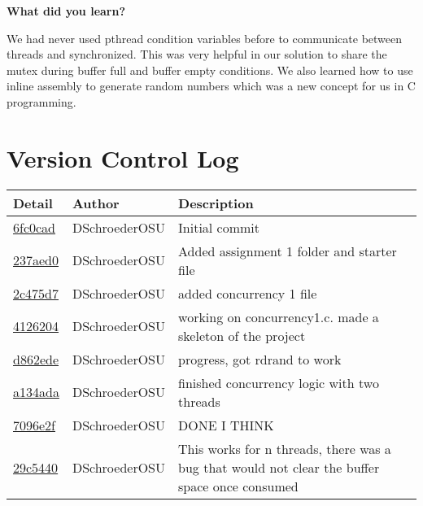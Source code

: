 \documentclass[10pt,letterpaper,draftclsnofoot,onecolumn]{IEEEtran}
\begin{document}
\bigskip

\noindent\textbf{What did you learn?}
\medskip

\noindent We had never used pthread condition variables before to communicate between threads and synchronized. This was very helpful in our solution to share the mutex during buffer full and buffer empty conditions. We also learned how to use inline assembly to generate random numbers which was a new concept for us in C programming.\par
\bigskip

\section{Version Control Log}
\bigskip

\noindent\begin{tabular}{l l l}\textbf{Detail} & \textbf{Author} & \textbf{Description}\\\hline
\href{https://github.com/DSchroederOSU/CS444-Group\_11\_05/commit/6fc0cad45a2a515f54c120fa6d411cbb62a0eed5}{6fc0cad} & DSchroederOSU & Initial commit\\\hline
\href{https://github.com/DSchroederOSU/CS444-Group\_11\_05/commit/237aed09afe1e61e9421f419164f4d41387adddd}{237aed0} & DSchroederOSU & Added assignment 1 folder and starter file\\\hline
\href{https://github.com/DSchroederOSU/CS444-Group\_11\_05/commit/2c475d7e15d1a54406c275a2a27c5df472c46ded}{2c475d7} & DSchroederOSU & added concurrency 1 file\\\hline
\href{https://github.com/DSchroederOSU/CS444-Group\_11\_05/commit/4126204c49cd2e10090eb4d6bd3183bc23c94648}{4126204} & DSchroederOSU & working on concurrency1.c. made a skeleton of the project\\\hline
\href{https://github.com/DSchroederOSU/CS444-Group\_11\_05/commit/d862edec54dd0eb51bdde6e26337315a2675d434}{d862ede} & DSchroederOSU & progress, got rdrand to work\\\hline
\href{https://github.com/DSchroederOSU/CS444-Group\_11\_05/commit/a134adaeeff0b0ebc7bc662d809edc973ab6f841}{a134ada} & DSchroederOSU & finished concurrency logic with two threads\\\hline
\href{https://github.com/DSchroederOSU/CS444-Group\_11\_05/commit/7096e2f214d8f164dcf02c58d8924f903281e867}{7096e2f} & DSchroederOSU & DONE I THINK\\\hline
\href{https://github.com/DSchroederOSU/CS444-Group\_11\_05/commit/29c5440b4d14c3656d11c907e8794f6f08d98897}{29c5440} & DSchroederOSU & This works for n threads, there was a bug that would not clear the buffer space once consumed\\\hline

\end{tabular}
\end{document}
